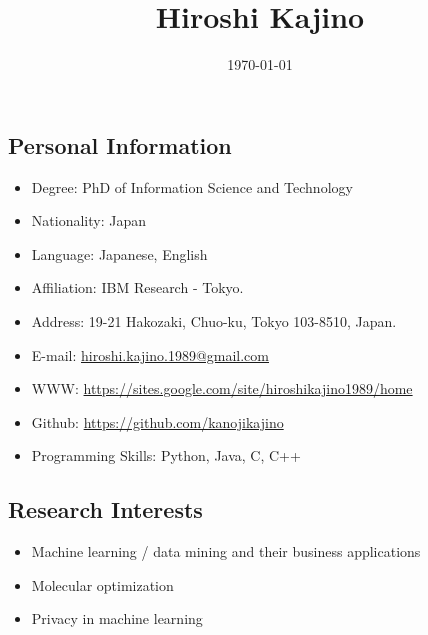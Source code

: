 \documentclass[a4paper,9pt]{article}
\title{Hiroshi Kajino}
\date{\today}
\begin{document}
\maketitle
\subsection*{Personal Information}
\begin{itemize}
 \item Degree: PhD of Information Science and Technology
 \item Nationality: Japan
 \item Language: Japanese, English
 \item Affiliation: IBM Research - Tokyo.
 \item Address: 19-21 Hakozaki, Chuo-ku, Tokyo 103-8510, Japan.
 \item E-mail: \url{hiroshi.kajino.1989@gmail.com}
 \item WWW: \url{https://sites.google.com/site/hiroshikajino1989/home}
 \item Github: \url{https://github.com/kanojikajino}
 \item Programming Skills: Python, Java, C, C++
\end{itemize}
\subsection*{Research Interests}
\begin{itemize}
 \item Machine learning / data mining and their business applications
 \item Molecular optimization
 \item Privacy in machine learning
\end{itemize}
\end{document}
